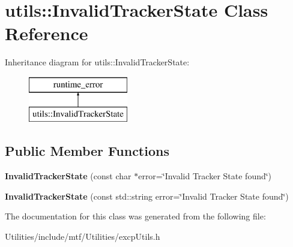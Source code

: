 \hypertarget{classutils_1_1InvalidTrackerState}{\section{utils\-:\-:Invalid\-Tracker\-State Class Reference}
\label{classutils_1_1InvalidTrackerState}
}
Inheritance diagram for utils\-:\-:Invalid\-Tracker\-State\-:\begin{figure}[H]
\begin{center}
\leavevmode
\includegraphics[height=2.000000cm]{classutils_1_1InvalidTrackerState}
\end{center}
\end{figure}
\subsection*{Public Member Functions}
\begin{DoxyCompactItemize}
\item 
\hypertarget{classutils_1_1InvalidTrackerState_a7a989895e03cb323118511619dc40ea5}{{\bfseries Invalid\-Tracker\-State} (const char $\ast$error=\char`\"{}Invalid Tracker State found\char`\"{})}\label{classutils_1_1InvalidTrackerState_a7a989895e03cb323118511619dc40ea5}

\item 
\hypertarget{classutils_1_1InvalidTrackerState_a23242aaa03868ef958416ac9223b8fd0}{{\bfseries Invalid\-Tracker\-State} (const std\-::string error=\char`\"{}Invalid Tracker State found\char`\"{})}\label{classutils_1_1InvalidTrackerState_a23242aaa03868ef958416ac9223b8fd0}

\end{DoxyCompactItemize}


The documentation for this class was generated from the following file\-:\begin{DoxyCompactItemize}
\item 
Utilities/include/mtf/\-Utilities/excp\-Utils.\-h\end{DoxyCompactItemize}
